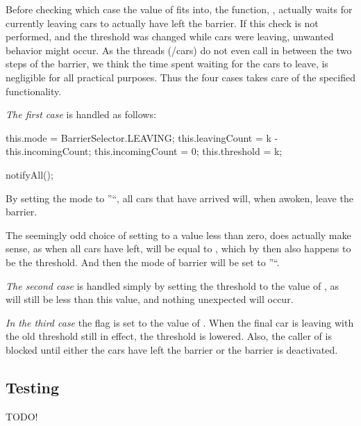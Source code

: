 Before checking which case the value of  fits into, the function, , actually waits for currently leaving cars to actually have left the barrier. If this check is not performed, and the threshold was changed while cars were leaving, unwanted behavior might occur. As the threads (/cars) do not even call  in between the two steps of the barrier, we think the time spent waiting for the cars to leave, is negligible for all practical purposes. Thus the four cases takes care of the specified functionality.

\emph{The first case} is handled as follows:
\begin{java}
this.mode = BarrierSelector.LEAVING;
this.leavingCount = k - this.incomingCount;
this.incomingCount = 0;
this.threshold = k;

notifyAll();
\end{java}

By setting the mode to ''``, all cars that have arrived will, when awoken, leave the barrier.

The seemingly odd choice of setting  to a value less than zero, does actually make sense, as when all cars have left,   will be equal to , which by then also happens to be the threshold. And then the mode of barrier will be set to ''``.

\emph{The second case} is handled simply by setting the threshold to the value of , as  will still be less than this value, and nothing unexpected will occur.

\emph{In the third case} the flag  is set to the value of . When the final car is leaving with the old threshold still in effect, the threshold is lowered. Also, the caller of  is blocked until either the cars have left the barrier or the barrier is deactivated.


\subsection{Testing}
\label{sub:bar-test}
TODO!